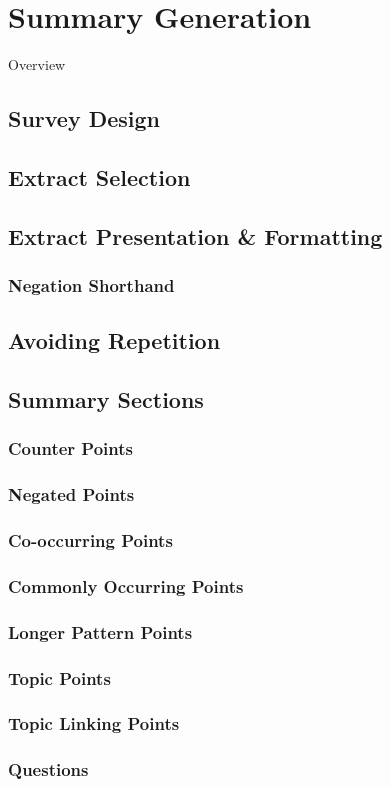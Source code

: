 \chapter{Summary Generation\label{chap:summary-generation}}
  Overview
  \section{Survey Design}
  \section{Extract Selection}
  \section{Extract Presentation \& Formatting}
    \subsection{Negation Shorthand}
  \section{Avoiding Repetition}
  \section{Summary Sections}
    \subsection{Counter Points}
    \subsection{Negated Points}
    \subsection{Co-occurring Points}
    \subsection{Commonly Occurring Points}
    \subsection{Longer Pattern Points}
    \subsection{Topic Points}
    \subsection{Topic Linking Points}
    \subsection{Questions}
